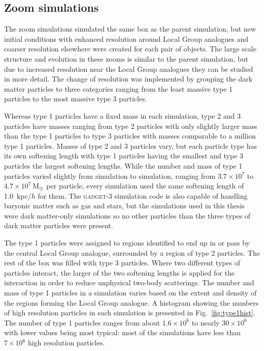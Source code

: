 \documentclass[english, twoside]{HYgradu}
\begin{document}
\subsection{Zoom simulations} \label{sect:zooms}
The zoom simulations simulated the same box as the parent simulation, but new initial conditions with enhanced resolution around Local Group analogues and coarser resolution elsewhere were created for each pair of objects. The large scale structure and evolution in these zooms is similar to the parent simulation, but due to increased resolution near the Local Group analogues they can be studied in more detail. The change of resolution was implemented by grouping the dark matter particles to three categories ranging from the least massive type 1 particles to the most massive type 3 particles.

Whereas type 1 particles have a fixed mass in each simulation, type 2 and 3 particles have masses ranging from type 2 particles with only slightly larger mass than the type 1 particles to type 3 particles with masses comparable to a million type 1 particles. Masses of type 2 and 3 particles vary, but each particle type has its own softening length with type 1 particles having the smallest and type 3 particles the largest softening lengths. While the number and mass of type 1 particles varied slightly from simulation to simulation, ranging from $3.7 \times 10^7$ to $4.7 \times 10^7~\mathrm{M}_{\astrosun}$ per particle, every simulation used the same softening length of 1.0~kpc/$h$ for them. The \textsc{gadget-3} simulation code is also capable of handling baryonic matter such as gas and stars, but the simulations used in this thesis were dark matter-only simulations so no other particles than the three types of dark matter particles were present. 


The type 1 particles were assigned to regions identified to end up in or pass by the central Local Group analogue, surrounded by a region of type 2 particles. The rest of the box was filled with type 3 particles. Where two different types of particles interact, the larger of the two softening lengths is applied for the interaction in order to reduce unphysical two-body scatterings. The number and mass of type 1 particles in a simulation varies based on the extent and density of the regions forming the Local Group analogue. A histogram showing the numbers of high resolution particles in each simulation is presented in Fig.\ \ref{fig:type1hist}. The number of type 1 particles ranges from about $1.6 \times 10^6$  to nearly $30 \times 10^6$ with lower values being most typical: most of the simulations have less than $7 \times 10^6$ high resolution particles. %
\end{document}
